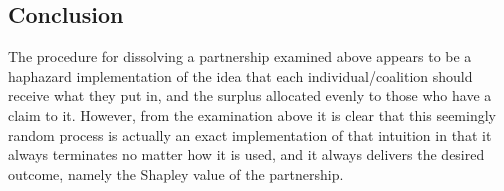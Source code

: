 \documentclass[12pt]{article}
\begin{document}
\subsection*{Conclusion}

The procedure for dissolving a partnership examined above appears to be a
haphazard implementation of the idea that each individual/coalition should
receive what they put in, and the surplus allocated evenly to those who have a
claim to it. However, from the examination above it is clear that this seemingly
random process is actually an exact implementation of that intuition in that
it always terminates no matter how it is used, and it always delivers the desired
outcome, namely the Shapley value of the partnership.
\end{document}
